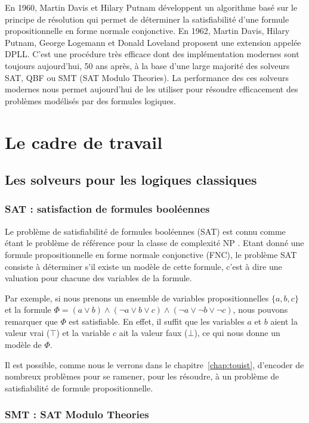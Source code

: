 En 1960, Martin Davis et Hilary Putnam développent un algorithme basé sur le principe de résolution qui permet de déterminer la satisfiabilité d'une formule propositionnelle en forme normale conjonctive. En 1962, Martin Davis, Hilary Putnam, George Logemann et Donald Loveland proposent une extension appelée DPLL. C'est une procédure très efficace dont des implémentation modernes sont toujours aujourd'hui, 50 ans après, à la base d'une large majorité des solveurs SAT, QBF ou SMT (SAT Modulo Theories).
La performance des ces solveurs modernes nous permet aujourd'hui de les utiliser pour résoudre efficacement des problèmes modélisés par des formules logiques.

\section{Le cadre de travail}

\subsection{Les solveurs pour les logiques classiques}

\subsubsection{SAT : satisfaction de formules booléennes}

Le problème de satisfiabilité de formules booléennes (SAT) est connu comme étant le problème de référence pour la classe de complexité NP \cite{DBLP:conf/stoc/Cook71}.
Etant donné une formule propositionnelle en forme normale conjonctive (FNC), le problème SAT consiste à déterminer s'il existe un modèle de cette formule, c'est à dire une valuation pour chacune des variables de la formule.

Par exemple, si nous prenons un ensemble de variables propositionnelles $\{a,b,c\}$ et la formule $\Phi = (a \vee b) \wedge (\neg a \vee b \vee c) \wedge (\neg a \vee \neg b \vee \neg c)$, nous pouvons remarquer que $\Phi$ est satisfiable. En effet, il suffit que les variables $a$ et $b$ aient la valeur vrai ($\top$) et la variable $c$ ait la valeur faux ($\bot$), ce qui nous donne un modèle de $\Phi$.

Il est possible, comme nous le verrons dans le chapitre~\ref{chap:touist}, d'encoder de nombreux problèmes pour se ramener, pour les résoudre, à un problème de satisfiabilité de formule propositionnelle.

\subsubsection{SMT : SAT Modulo Theories}


